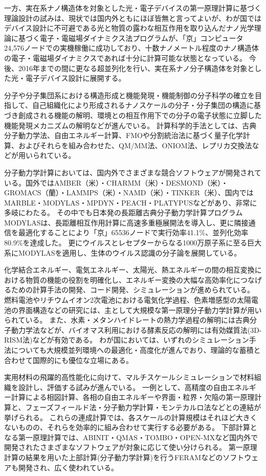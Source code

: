 一方、実在系ナノ構造体を対象とした光・電子デバイスの第一原理計算に基づく理論設計の試みは、現状では国内外ともにほぼ皆無と言ってよいが、わが国ではデバイス設計に不可避である光と物質の露わな相互作用を取り込んだナノ光学理論に基づく電子・電磁場ダイナミクス法プログラムが、「京」コンピュータ24,576ノードでの実機稼働に成功しており、十数ナノメートル程度のナノ構造体の電子・電磁場ダイナミクスであれば十分に計算可能な状態となっている。
今後、2016年までの間に更なる超並列化を行い、実在系ナノ分子構造体を対象とした光・電子デバイス設計に展開する。

分子や分子集団系における構造形成と機能発現・機能制御の分子科学の確立を目指して、自己組織化により形成されるナノスケールの分子・分子集団の構造に基づき創成される機能の解明、環境との相互作用下での分子の電子状態に立脚した機能発現メカニズムの解明などが進んでいる。
計算科学的手法としては、古典分子動力学法、自由エネルギー計算、FMOや分割統治法に基づく量子化学計算、およびそれらを組み合わせた、QM/MM法、ONIOM法、レプリカ交換法などが用いられている。

分子動力学計算においては、国内外でさまざまな競合ソフトウェアが開発されている。国外ではAMBER（米）・CHARMM（米）・DESMOND（米）・GROMACS（蘭）・LAMMPS（米）・NAMD（米）・TINKER（米）、国内ではMARBLE・MODYLAS・MPDYN・PEACH・PLATYPUSなどがあり、非常に多岐にわたる。
その中でも日本発の長距離古典分子動力学計算プログラムMODYLASは、長距離相互作用計算に高速多重極展開法を導入し、更に隣接通信を最適化することにより「京」65536ノードで実行効率41.1\%、並列化効率80.9\%を達成した。
更にウイルスとレセプターからなる1000万原子系に至る巨大系にMODYLASを適用し、生体のウイルス認識の分子論を展開している。

化学結合エネルギー、電気エネルギー、太陽光、熱エネルギーの間の相互変換における物質の機能の役割を明確化し、エネルギー変換の大幅な高効率化につなげるための計算手法の開発、コード開発、シミュレーションが進められている。
燃料電池やリチウムイオン2次電池における電気化学過程、色素増感型の太陽電池の界面構造などの研究には、主として大規模な第一原理分子動力学計算が用いられている。
また、水素・メタンハイドレートの熱力学過程の解明には古典分子動力学法などが、バイオマス利用における酵素反応の解明には有効媒質法(3D-RISM法)などが有効である。
わが国においては、いずれのシミュレーション手法についても大規模並列環境への最適化・高度化が進んでおり、理論的な蓄積と合わせて国際的にも優位な立場にある。

実用材料の飛躍的高性能化に向けて、マルチスケールシミュレーションで材料組織を設計し、評価する試みが進んでいる。
一例として、高精度の自由エネルギー計算による相図計算、各相の自由エネルギーや界面・粒界・欠陥の第一原理計算と、フェーズフィールド法・分子動力学計算・モンテカルロ法などとの連結が挙げられる。
これらの連成計算では、各スケールの計算規模はそれほど大きくないものの、それらを効率的に組み合わせて実行する必要がある。
下部計算となる第一原理計算では、ABINIT・QMAS・TOMBO・OPEN-MXなど国内外で開発されたさまざまなソフトウェアが対象に応じて使い分けられる。
第一原理計算の結果を用いた上部計算(分子動力学計算)を行うFERAMなどのソフトウェアも開発され、広く使われている。

